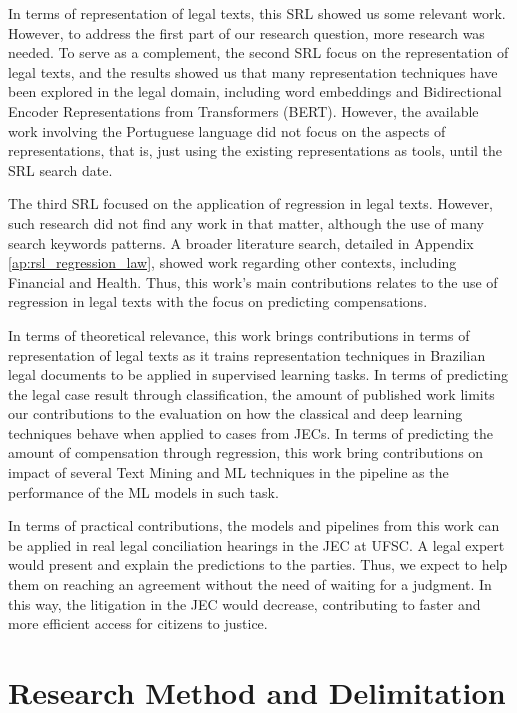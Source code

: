 In terms of representation of legal texts, this SRL showed us some relevant work. However,  to address the first part of our research question, more research was needed. To serve as a complement, the second SRL focus on the representation of legal texts, and the results showed us that many representation techniques have been explored in the legal domain, including word embeddings and Bidirectional Encoder Representations from Transformers (BERT). However, the available work involving  the Portuguese language did not focus on the aspects of representations, that is, just using the existing representations as tools, until the SRL search date.

The third SRL focused on the application of regression in legal texts. However, such research did not find any work in that matter, although the use of many search keywords patterns. A broader literature search, detailed in Appendix \ref{ap:rsl_regression_law}, showed work regarding other contexts, including Financial and Health. Thus, this work's main contributions relates to the use of regression in legal texts with the focus on predicting compensations.

In terms of theoretical relevance, this work brings  contributions in terms of representation of legal texts as it trains representation techniques in Brazilian legal documents to be applied in supervised learning tasks. In terms of predicting the legal case result through classification, the  amount of published work limits our contributions to the evaluation on how the classical and deep learning techniques behave when applied to cases from JECs. In terms of predicting the amount of compensation through regression, this work bring contributions on impact of several Text Mining and ML techniques in the pipeline as the performance of the ML models in such task.

In terms of practical contributions, the models and pipelines from this work can be applied in real legal conciliation hearings in the JEC at UFSC. A legal expert would present and explain the predictions to the parties. Thus, we expect to help them on reaching an agreement without the need of waiting for a judgment. In this way, the litigation in the JEC would decrease, contributing to faster and more efficient access for citizens to justice.

\section{Research Method and Delimitation}

